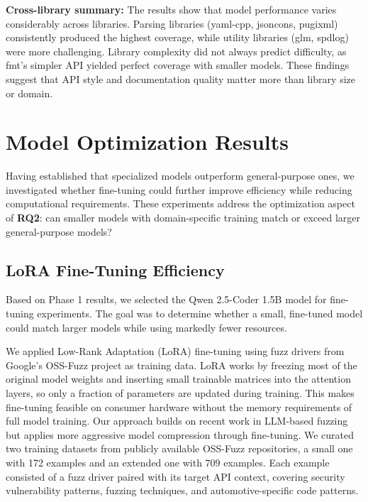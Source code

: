 \textbf{Cross-library summary:} The results show that model performance varies considerably across libraries. Parsing libraries (yaml-cpp, jsoncons, pugixml) consistently produced the highest coverage, while utility libraries (glm, spdlog) were more challenging. Library complexity did not always predict difficulty, as fmt's simpler API yielded perfect coverage with smaller models. These findings suggest that API style and documentation quality matter more than library size or domain.


\section{Model Optimization Results}
\label{sec:results_optimization}

Having established that specialized models outperform general-purpose ones, we investigated whether fine-tuning could further improve efficiency while reducing computational requirements. These experiments address the optimization aspect of \textbf{RQ2}: can smaller models with domain-specific training match or exceed larger general-purpose models?

\subsection{LoRA Fine-Tuning Efficiency}
\label{sec:results_lora_efficiency}

Based on Phase 1 results, we selected the Qwen 2.5-Coder 1.5B model for fine-tuning experiments. The goal was to determine whether a small, fine-tuned model could match larger models while using markedly fewer resources.

We applied Low-Rank Adaptation (LoRA) \cite{Hu2021} fine-tuning using fuzz drivers from Google's OSS-Fuzz project as training data. LoRA works by freezing most of the original model weights and inserting small trainable matrices into the attention layers, so only a fraction of parameters are updated during training. This makes fine-tuning feasible on consumer hardware without the memory requirements of full model training. Our approach builds on recent work in LLM-based fuzzing \cite{llm4fuzz,TitanFuzz2022} but applies more aggressive model compression through fine-tuning. We curated two training datasets from publicly available OSS-Fuzz repositories, a small one with 172 examples and an extended one with 709 examples. Each example consisted of a fuzz driver paired with its target API context, covering security vulnerability patterns, fuzzing techniques, and automotive-specific code patterns.


